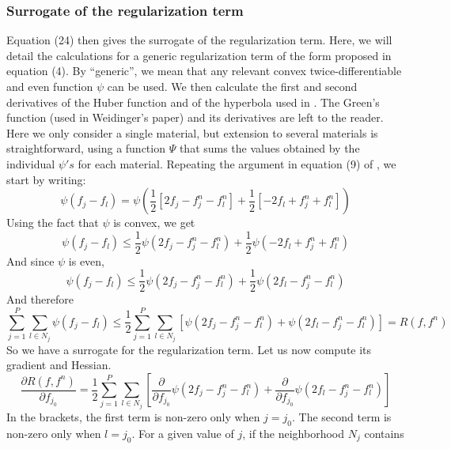 \documentclass[a4paper, 10pt]{article}
\begin{document}
\subsubsection{Surrogate of the regularization term}
\label{sec:regulWeidinger}
Equation (24) then gives the surrogate of the regularization term. Here, we will detail the calculations for a generic regularization term of the form proposed in equation (4). By ``generic'', we mean
that any relevant convex twice-differentiable and even function $\psi$ can be used. We then calculate the first and second derivatives of the Huber function and of the hyperbola used in \cite{long_multi-material_2014}.
The Green's function (used in Weidinger's paper) \cite{green_bayesian_1990} and its derivatives are left to the reader.
Here we only consider a single material, but extension to several materials is straightforward, using a function $\Psi$ that sums the values obtained by the individual $\psi's$ for each material.
Repeating the argument in equation (9) of \cite{erdogan_ordered_1999}, we start by writing:
\begin{equation*}
 \psi(f_j - f_l) = \psi \left( \frac{1}{2} [2 f_j - f_j^n - f_l^n] + \frac{1}{2} [- 2 f_l + f_j^n + f_l^n] \right)
\end{equation*}
Using the fact that $\psi$ is convex, we get
\begin{equation*}
 \psi(f_j - f_l) \leq \frac{1}{2} \psi (2 f_j - f_j^n - f_l^n) + \frac{1}{2} \psi(- 2 f_l + f_j^n + f_l^n )
\end{equation*}
And since $\psi$ is even,
\begin{equation*}
 \psi(f_j - f_l) \leq \frac{1}{2} \psi (2 f_j - f_j^n - f_l^n) + \frac{1}{2} \psi(2 f_l - f_j^n - f_l^n )
\end{equation*}
And therefore 
\begin{equation*}
 \sum_{j=1}^P \sum_{l \in N_j} \psi(f_j - f_l) \leq \frac{1}{2} \sum_{j=1}^P \sum_{l \in N_j} \left[ \psi (2 f_j - f_j^n - f_l^n) + \psi(2 f_l - f_j^n - f_l^n ) \right] = R(f, f^n)
\end{equation*}
So we have a surrogate for the regularization term. Let us now compute its gradient and Hessian.
\begin{equation*}
\frac{\partial R(f, f^n)}{\partial f_{j_0}} =\frac{1}{2} \sum_{j=1}^P \sum_{l \in N_j} \left[ \frac{\partial}{\partial f_{j_0}} \psi (2 f_j - f_j^n - f_l^n) + \frac{\partial}{\partial f_{j_0}} \psi(2 f_l - f_j^n - f_l^n ) \right]
\end{equation*}
In the brackets, the first term is non-zero only when $j=j_0$. The second term is non-zero only when $l = j_0$. For a given value of $j$, if the neighborhood $N_j$ contains
\end{document}
